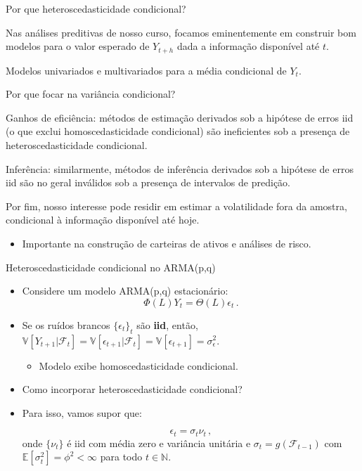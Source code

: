 \documentclass[11pt]{beamer}
\newenvironment{halfwideitemize}{\itemize\addtolength{\itemsep}{0.5em}}{\enditemize}
\newenvironment{halfwideenumerate}{\enumerate\addtolength{\itemsep}{0.5em}}{\endenumerate}
\begin{document}
\begin{frame}{Por que heteroscedasticidade condicional?}
\begin{halfwideitemize}
	\item Nas análises preditivas de nosso curso, focamos eminentemente em construir bom modelos para o valor esperado de $Y_{t+h}$ dada a informação disponível até $t$.
	\begin{halfwideitemize}
		\item Modelos univariados e multivariados para a {\color{blue}média condicional} de $Y_t$.
	\end{halfwideitemize}
		\item Por que focar na {\color{blue}variância condicional}?
	\begin{halfwideenumerate}

		\item Ganhos de eficiência: métodos de estimação derivados sob a hipótese de erros iid (o que exclui homoscedasticidade condicional) são {\color{blue}ineficientes} sob a presença de heteroscedasticidade condicional.
		\item Inferência: similarmente, métodos de inferência derivados sob a hipótese de erros iid são no geral {\color{blue}inválidos} sob a presença de intervalos de predição.
		\item  Por fim, nosso interesse pode residir em {\color{blue}estimar} a volatilidade fora da amostra, condicional à informação disponível até hoje.
		\begin{itemize}
			\item Importante na construção de carteiras de ativos e análises de risco.
		\end{itemize}
		\end{halfwideenumerate}
\end{halfwideitemize}
\end{frame}

\begin{frame}{Heteroscedasticidade condicional no ARMA(p,q)}
\begin{itemize}
	\item Considere um modelo ARMA(p,q) estacionário:
	$$\Phi(L)Y_t = \Theta(L)\epsilon_t \, .$$
	\item Se os ruídos brancos $\{\epsilon_{t}\}_t$ são \textbf{iid}, então, $\mathbb{V}[Y_{t+1}|\mathcal{F}_t] = \mathbb{V}[\epsilon_{t+1}|\mathcal{F}_t] = \mathbb{V}[\epsilon_{t+1}]  = \sigma^2_{\epsilon}$.
	\begin{itemize}
		\item Modelo exibe homoscedasticidade condicional.
	\end{itemize}
	\item Como incorporar heteroscedasticidade condicional?
		\item Para isso, vamos supor que:
		
		$$\epsilon_t = \sigma_t \nu_t  \, ,$$
		onde $\{\nu_t\}$ é iid  com  média zero e variância unitária e $\sigma_t = g(\mathcal{F}_{t-1})$ com $\mathbb{E}[\sigma^2_{t}] = \phi^2 < \infty$ para todo $t \in \mathbb{N}$.
\end{itemize}
\end{frame}
\end{document}
